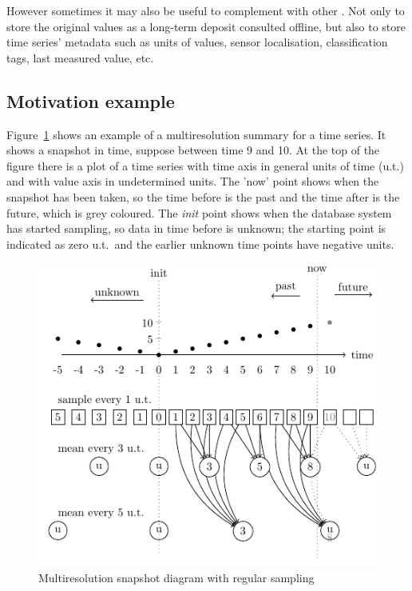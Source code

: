 However sometimes it may also be useful to complement 
with other . Not only to store the original values as a
long-term deposit consulted offline, but also to store time series'
metadata such as units of values, sensor localisation, classification
tags, last measured value, etc.



\subsection{Motivation example}

Figure~\ref{fig:mtsms:sequence} shows an example of a multiresolution
summary for a time series. It shows a snapshot in time, suppose
between time 9 and 10. At the top of the figure there is a plot of a
time series with time axis in general units of time (u.t.) and with
value axis in undetermined units. The 'now' point shows when the
snapshot has been taken, so the time before is the past and the time
after is the future, which is grey coloured. The \emph{init} point
shows when the database system has started sampling, so data in time
before is unknown; the starting point is indicated as zero u.t.\ and
the earlier unknown time points have negative units.


\begin{figure}
  \centering
  \includegraphics{fig_mtsms_sequence.pdf}
  \caption{Multiresolution snapshot diagram with regular sampling}
  \label{fig:mtsms:sequence}
\end{figure}


